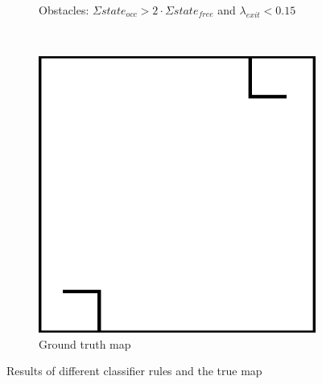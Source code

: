 \begin{figure}[htbp]
\begin{subfigure}{.5\textwidth}
		\caption{Obstacles: \(\Sigma state_{occ} > 2 \cdot \Sigma state_{free}\) and \(\lambda_{exit} < 0.15\) }
		\label{fig:amcl_classifier:chosen}
	\end{subfigure}\\[1ex]
	\begin{subfigure}{1\textwidth}
		\centering
		\includegraphics[width=.5\linewidth]{chapters/cost_interpretation/figures/dynamic_area_web.png}
		\caption{Ground truth map}
		\label{fig:amcl_classifier:groundtruth}
	\end{subfigure}
	
	\caption{Results of different classifier rules and the true map}
\end{figure}
